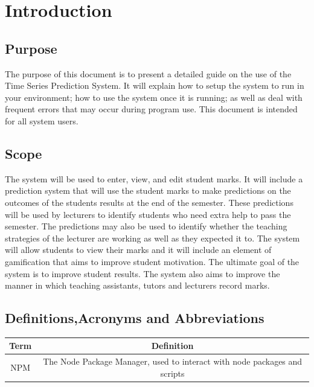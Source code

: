 \documentclass[a4paper,12pt]{article}
\begin{document}
    \tableofcontents
    
    \clearpage
            
    \section{Introduction}
    	
        \subsection{Purpose}
        
        The purpose of this document is to present a detailed guide on the use of the Time Series Prediction System. It will explain how to setup the system to run in your environment; how to use the system once it is running; as well as deal with frequent errors that may occur during program use. This document is intended for all system users.
          
        \subsection {Scope}
        
        The system will be used to enter, view, and edit student marks. It will include a prediction system that will use the student marks to make predictions on the outcomes of the students results at the end of the semester. These predictions will be used by lecturers to identify students who need extra help to pass the semester. The predictions may also be used to identify whether the teaching strategies of the lecturer are working as well as they expected it to. The system will allow students to view their marks and it will include an element of gamification that aims to improve student motivation. The ultimate goal of the system is to improve student results. The system also aims to improve the manner in which teaching assistants, tutors and lecturers record marks.
        
        
        \subsection{Definitions,Acronyms and Abbreviations}
        
        \begin{tabular}{ |c|c| } 
        	\hline
        	Term & Definition \\
        	\hline
        	NPM & The Node Package Manager, used to interact with node packages and scripts\\
        	\hline
        \end{tabular}
       
\end{document}
